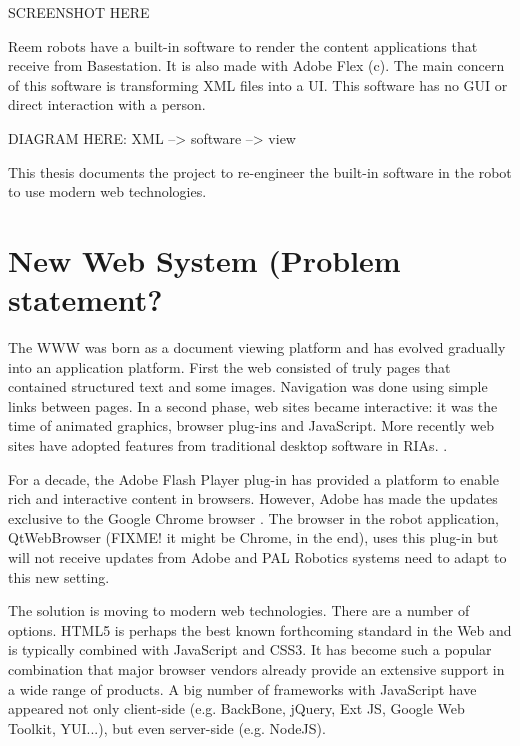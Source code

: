 SCREENSHOT HERE

Reem robots have a built-in software to render the content applications that receive from Basestation. 
It is also made with Adobe Flex (c).
The main concern of this software is transforming \ac{XML} files into a \ac{UI}. 
This software has no \ac{GUI} or direct interaction with a person.

DIAGRAM HERE: XML --> software --> view

This thesis documents the project to re-engineer the built-in software in the robot to use modern web technologies.

\section{New Web System (Problem statement?}
The \ac{WWW} was born as a document viewing platform and has evolved gradually into an application platform. 
First the web consisted of truly pages that contained structured text and some images. 
Navigation was done using simple links between pages. 
In a second phase, web sites became interactive: 
it was the time of animated graphics, browser plug-ins and JavaScript. 
More recently web sites have adopted features from traditional desktop software in \acp{RIA}. \cite{Anttonen:2011}.

For a decade, the Adobe Flash Player plug-in has provided a platform to enable rich and interactive content in browsers.
However, Adobe has made the updates exclusive to the Google Chrome browser \cite{FlashRoadmap}. 
The browser in the robot application, QtWebBrowser (FIXME! it might be Chrome, in the end), uses this plug-in but will not receive updates from Adobe and PAL Robotics systems need to adapt to this new setting. 

The solution is moving to modern web technologies.
There are a number of options. \ac{HTML5} is perhaps the best known forthcoming standard in the Web and is typically combined with JavaScript and \ac{CSS3}. 
It has become such a popular combination that major browser vendors already provide an extensive support in a wide range of products.
A big number of frameworks with JavaScript have appeared not only client-side (e.g. BackBone, jQuery, Ext JS, Google Web Toolkit, YUI...), but even server-side (e.g. NodeJS).

